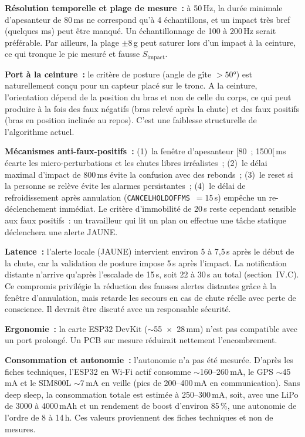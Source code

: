 \documentclass[12pt,a4paper]{article}
\renewcommand{\_}{\textunderscore\allowbreak}
\begin{document}
\textbf{Résolution temporelle et plage de mesure~:} à 50\,Hz, la durée minimale d'apesanteur de 80\,ms ne correspond qu'à 4 échantillons, et un impact très bref (quelques ms) peut être manqué. Un échantillonnage de 100 à 200\,Hz serait préférable. Par ailleurs, la plage $\pm$8\,g peut saturer lors d'un impact à la ceinture, ce qui tronque le pic mesuré et fausse $S_{\text{impact}}$.

\textbf{Port à la ceinture~:} le critère de posture (angle de gîte $>50$°) est naturellement conçu pour un capteur placé sur le tronc. A la ceinture, l'orientation dépend de la position du bras et non de celle du corps, ce qui peut produire à la fois des faux négatifs (bras relevé après la chute) et des faux positifs (bras en position inclinée au repos). C'est une faiblesse structurelle de l'algorithme actuel.

\textbf{Mécanismes anti-faux-positifs~:} (1)~la fenêtre d'apesanteur [80~; 1500[\,ms écarte les micro-perturbations et les chutes libres irréalistes~; (2)~le délai maximal d'impact de 800\,ms évite la confusion avec des rebonds~; (3)~le reset si la personne se relève évite les alarmes persistantes~; (4)~le délai de refroidissement après annulation (\texttt{CANCEL\_HOLDOFF\_MS}~$=15$\,s) empêche un re-déclenchement immédiat. Le critère d'immobilité de 20\,s reste cependant sensible aux faux positifs~: un travailleur qui lit un plan ou effectue une tâche statique déclenchera une alerte JAUNE.

\textbf{Latence~:} l'alerte locale (JAUNE) intervient environ 5 à 7,5\,s après le début de la chute, car la validation de posture impose 5\,s après l'impact. La notification distante n'arrive qu'après l'escalade de 15\,s, soit 22 à 30\,s au total (section~IV.C). Ce compromis privilégie la réduction des fausses alertes distantes grâce à la fenêtre d'annulation, mais retarde les secours en cas de chute réelle avec perte de conscience. Il devrait être discuté avec un responsable sécurité.

\textbf{Ergonomie~:} la carte ESP32 DevKit ($\sim$55~$\times$~28\,mm) n'est pas compatible avec un port prolongé. Un PCB sur mesure réduirait nettement l'encombrement.

\textbf{Consommation et autonomie~:} l'autonomie n'a pas été mesurée. D'après les fiches techniques, l'ESP32 en Wi-Fi actif consomme $\sim$160--260\,mA, le GPS $\sim$45\,mA et le SIM800L $\sim$7\,mA en veille (pics de 200--400\,mA en communication). Sans deep sleep, la consommation totale est estimée à 250--300\,mA, soit, avec une LiPo de 3000 à 4000\,mAh et un rendement de boost d'environ 85\,\%, une autonomie de l'ordre de 8 à 14\,h. Ces valeurs proviennent des fiches techniques et non de mesures.
\end{document}
